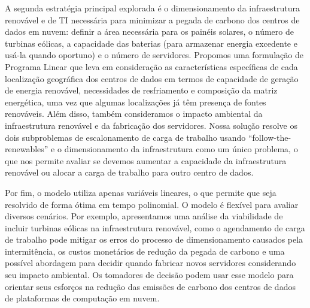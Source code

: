 A segunda estratégia principal explorada é o dimensionamento da infraestrutura renovável e de TI necessária para minimizar a pegada de carbono dos centros de dados em nuvem: definir a área necessária para os painéis solares, o número de turbinas eólicas, a capacidade das baterias (para armazenar energia excedente e usá-la quando oportuno) e o número de servidores. Propomos uma formulação de Programa Linear que leva em consideração as características específicas de cada localização geográfica dos centros de dados em termos de capacidade de geração de energia renovável, necessidades de resfriamento e composição da matriz energética, uma vez que algumas localizações já têm presença de fontes renováveis. Além disso, também consideramos o impacto ambiental da infraestrutura renovável e da fabricação dos servidores. Nossa solução resolve os dois subproblemas de escalonamento de carga de trabalho usando ``follow-the-renewables'' e o dimensionamento da infraestrutura como um único problema, o que nos permite avaliar se devemos aumentar a capacidade da infraestrutura renovável ou alocar a carga de trabalho para outro centro de dados.

Por fim, o modelo utiliza apenas variáveis lineares, o que permite que seja resolvido de forma ótima em tempo polinomial. O modelo é flexível para avaliar diversos cenários. Por exemplo, apresentamos uma análise da viabilidade de incluir turbinas eólicas na infraestrutura renovável, como o agendamento de carga de trabalho pode mitigar os erros do processo de dimensionamento causados pela intermitência, os custos monetários de redução da pegada de carbono e uma possível abordagem para decidir quando fabricar novos servidores considerando seu impacto ambiental. Os tomadores de decisão podem usar esse modelo para orientar seus esforços na redução das emissões de carbono dos centros de dados de plataformas de computação em nuvem.





